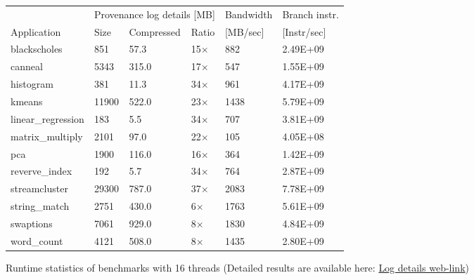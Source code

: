 \begin{figure}[t]
\centering
\myfontsize
{
\begin{tabular}{m{1.6cm}|m{.8cm}|m{1.1cm}|m{.6cm}|m{1.2cm}|m{1.4cm}}
       & \multicolumn{3}{c|}{ Provenance log details [MB] }   &  Bandwidth & Branch instr. \\
   { Application} & Size & Compressed & Ratio & [MB/sec] &  [Instr/sec] \\
  \hline \hline
    blackscholes& 851& 57.3 &15$\times$& 882& 2.49E+09 \\
    canneal& 5343& 315.0 & 17$\times$& 547& 1.55E+09 \\
    histogram& 381& 11.3 & 34$\times$& 961& 4.17E+09 \\
    kmeans& 11900& 522.0 &23$\times$& 1438& 5.79E+09 \\
    linear\_regression& 183& 5.5 &34$\times$& 707& 3.81E+09 \\
    matrix\_multiply& 2101& 97.0 &22$\times$& 105& 4.05E+08 \\
    pca& 1900& 116.0 &16$\times$& 364& 1.42E+09 \\
    reverve\_index& 192& 5.7 & 34$\times$& 764& 2.87E+09 \\
    streamcluster& 29300& 787.0 &37$\times$& 2083& 7.78E+09 \\
    string\_match& 2751& 430.0 &6$\times$& 1763& 5.61E+09 \\
    swaptions& 7061& 929.0 &8$\times$& 1830& 4.84E+09 \\
    word\_count& 4121& 508.0 & 8$\times$& 1435& 2.80E+09 \\

\hline
\end{tabular}
}


\caption{\label{tab:apps} Runtime statistics of benchmarks with 16 threads (Detailed results are available here: \href{https://mic92.github.io/inspector/index.html\#measurement_table}{Log details web-link}) }                                                                                                                                  


\end{figure}
